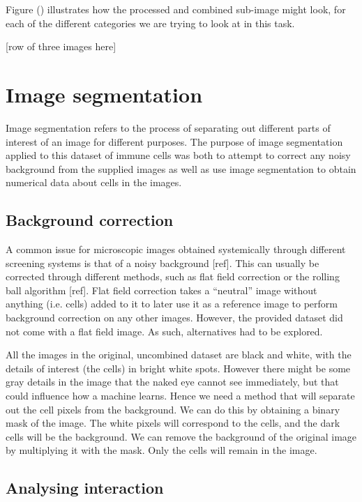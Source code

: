 \documentclass{l4proj}
\begin{document}
Figure () illustrates how the processed and combined sub-image might look, for each of the different categories we are trying to look at in this task.

[row of three images here]

\section{Image segmentation}

Image segmentation refers to the process of separating out different parts of interest of an image for different purposes. The purpose of image segmentation applied to this dataset of immune cells was both to attempt to correct any noisy background from the supplied images as well as use image segmentation to obtain numerical data about cells in the images.

\subsection{Background correction}

A common issue for microscopic images obtained systemically through different screening systems is that of a noisy background [ref]. This can usually be corrected through different methods, such as flat field correction or the rolling ball algorithm [ref]. Flat field correction takes a ``neutral” image without anything (i.e. cells) added to it to later use it as a reference image to perform background correction on any other images. However, the provided dataset did not come with a flat field image. As such, alternatives had to be explored.

\bigskip
All the images in the original, uncombined dataset are black and white, with the details of interest (the cells) in bright white spots. However there might be some gray details in the image that the naked eye cannot see immediately, but that could influence how a machine learns. Hence we need a method that will separate out the cell pixels from the background. We can do this by obtaining a binary mask of the image. The white pixels will correspond to the cells, and the dark cells will be the background. We can remove the background of the original image by multiplying it with the mask. Only the cells will remain in the image.

\subsection{Analysing interaction}
\end{document}
